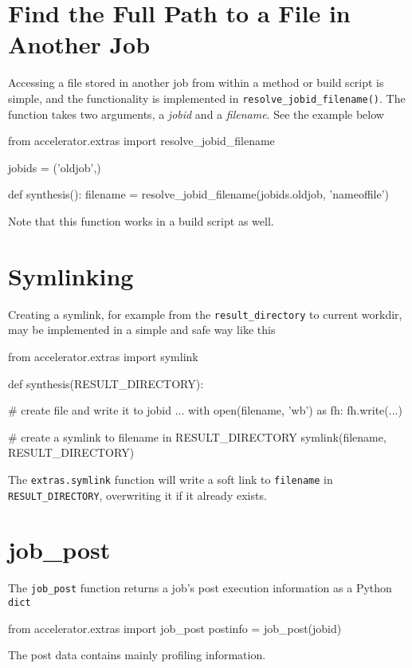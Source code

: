 \section{Find the Full Path to a File in Another Job}
Accessing a file stored in another job from within a method or build
script is simple, and the functionality is implemented
in \texttt{resolve\_jobid\_filename()}.  The function takes two
arguments, a \textsl{jobid} and a \textsl{filename}.  See the example
below
\begin{python}
from accelerator.extras import resolve_jobid_filename

jobids = ('oldjob',)

def synthesis():
    filename = resolve_jobid_filename(jobids.oldjob, 'nameoffile')
\end{python}
Note that this function works in a build script as well.



\section{Symlinking}
\label{sec:symlinking}
Creating a symlink, for example from the \texttt{result\_directory} to
current workdir, may be implemented in a simple and safe way like this
\begin{python}
from accelerator.extras import symlink

def synthesis(RESULT_DIRECTORY):

    # create file and write it to jobid
    ...
    with open(filename, 'wb') as fh:
        fh.write(...)

    # create a symlink to filename in RESULT_DIRECTORY
    symlink(filename, RESULT_DIRECTORY)
\end{python}
The \texttt{extras.symlink} function will write a soft link
to \texttt{filename} in \texttt{RESULT\_DIRECTORY}, overwriting it if
it already exists.



\section{job\_post}
The \texttt{job\_post} function returns a job's post execution
information as a Python \texttt{dict}
\begin{python}
from accelerator.extras import job_post
postinfo = job_post(jobid)
\end{python}
The post data contains mainly profiling information.



